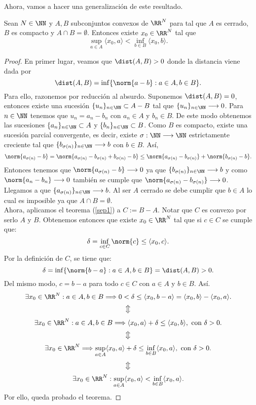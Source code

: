 Ahora, vamos a hacer una generalización de este resultado.
\begin{teoremaBox}\label{separacion1}
Sean $ N\in \NN $ y $ A,B $ subconjuntos convexos de $ \RR^N $ para tal que $ A $ es cerrado, $ B $ es compacto y $ A \cap B = \emptyset$. Entonces existe $ x_0 \in \RR^N $ tal que
\[
\sup_{a \in A} \langle x_0,a\rangle < \inf_{b\in B} \langle x_0,b\rangle.
\]
\end{teoremaBox}
\begin{proof}
En primer lugar, veamos que $ \dist(A,B) > 0 $ donde la distancia viene dada por \[\dist(A,B) = \inf\{ \norm{a-b} : a\in A, b\in B\}.\]
Para ello, razonemos por reducción al absurdo. Suponemos $ \dist(A,B) = 0 $, entonces existe una sucesión $ \{u_n\}_{n\in\NN} \subset A-B $ tal que $ \{u_n\}_{n\in\NN} \longrightarrow 0 $. Para $ n\in\NN $ tenemos que $ u_n = a_n - b_n $ con $ a_n \in A $ y $ b_n \in B $. De este modo obtenemos las sucesiones $ \{a_n\}_{n\in\NN} \subset A $ y $ \{b_n\}_{n\in\NN} \subset B $. Como $ B $ es compacto, existe una sucesión parcial convergente, es decir, existe $ \sigma: \NN \longrightarrow \NN $ estrictamente creciente tal que $ \{b_{\sigma(n)}\}_{n\in\NN} \longrightarrow b$ con $ b \in B $. Así,
\[
\norm{a_{\sigma(n)}-b} = \norm{a_{\sigma(n)} - b_{\sigma(n)} + b_{\sigma(n)} - b} \leq  \norm{a_{\sigma(n)} - b_{\sigma(n)}} + \norm{b_{\sigma(n)} - b}.
\]
Entonces tenemos que $ \norm{a_{\sigma(n)}-b} \longrightarrow 0 $ ya que $ \{b_{\sigma(n)}\}_{n\in\NN} \longrightarrow b$ y como $ \norm{a_n - b_n}\longrightarrow 0$ también se cumple que $ \norm{a_{\sigma(n)} - b_{\sigma(n)}}\longrightarrow 0$. Llegamos a que $ \{a_{\sigma(n)}\}_{n\in\NN} \longrightarrow b$. Al ser $ A $ cerrado se debe cumplir que $ b \in A $ lo cual es imposible ya que $ A \cap B = \emptyset$. \\

Ahora, aplicamos el teorema (\ref{sep1}) a $ C:= B-A $. Notar que $ C $ es convexo por serlo $ A $ y $ B $. Obtenemos entonces que existe $ x_0 \in \RR^N $ tal que si $ c \in C $ se cumple que:
\[
\delta = \inf_{c \in C} \norm{c} \leq \langle x_0, c\rangle.
\]
Por la definición de $ C $, se tiene que:
\[
\delta = \inf\{ \norm{b-a} : a\in A, b\in B\} = \dist(A,B) > 0.
\] 
Del mismo modo, $ c = b-a $ para todo $ c \in C $ con $ a \in A $ y $ b \in B $. Así.
\[
\exists x_0 \in \RR^N: a\in A, b\in B \Longrightarrow 0 <\delta \leq \langle x_0, b-a\rangle = \langle x_0, b\rangle - \langle x_0,a\rangle.
\]
\[
\big\Updownarrow
\]
\[
\exists x_0 \in \RR^N: a\in A, b\in B \Longrightarrow \langle x_0, a\rangle + \delta \leq \langle x_0, b\rangle ,\text{ con } \delta > 0.
\]
\[
\big\Updownarrow
\]
\[
\exists x_0 \in \RR^N \Longrightarrow \sup_{a\in A}\langle x_0, a\rangle + \delta \leq \inf_{b \in B}\langle x_0, a\rangle, \text{ con } \delta > 0.
\]
\[
\big\Updownarrow
\]
\[
\exists x_0 \in \RR^N : \sup_{a\in A}\langle x_0, a\rangle < \inf_{b \in B}\langle x_0, a\rangle.
\]
Por ello, queda probado el teorema.
\end{proof}

